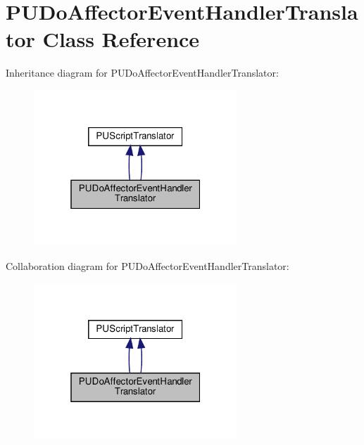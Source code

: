 \hypertarget{classPUDoAffectorEventHandlerTranslator}{}\section{P\+U\+Do\+Affector\+Event\+Handler\+Translator Class Reference}
\label{classPUDoAffectorEventHandlerTranslator}


Inheritance diagram for P\+U\+Do\+Affector\+Event\+Handler\+Translator\+:
\nopagebreak
\begin{figure}[H]
\begin{center}
\leavevmode
\includegraphics[width=217pt]{classPUDoAffectorEventHandlerTranslator__inherit__graph}
\end{center}
\end{figure}


Collaboration diagram for P\+U\+Do\+Affector\+Event\+Handler\+Translator\+:
\nopagebreak
\begin{figure}[H]
\begin{center}
\leavevmode
\includegraphics[width=217pt]{classPUDoAffectorEventHandlerTranslator__coll__graph}
\end{center}
\end{figure}
